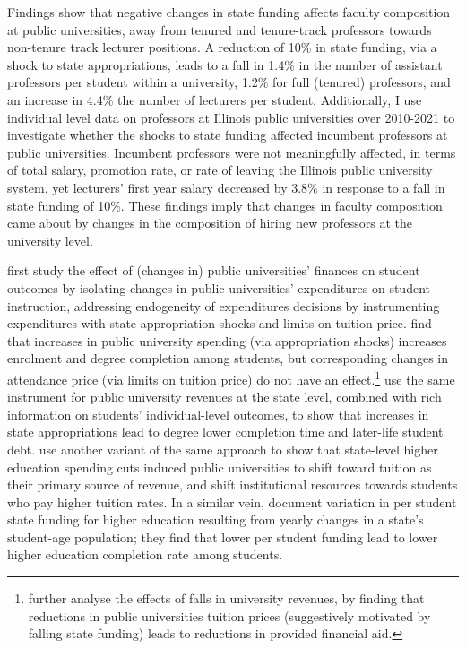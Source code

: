 \documentclass[notitlepage,12pt]{article}
\begin{document}
Findings show that negative changes in state funding affects faculty composition at public universities, away from tenured and tenure-track professors towards non-tenure track lecturer positions.
A reduction of 10\% in state funding, via a shock to state appropriations, leads to a fall in 1.4\% in the number of assistant professors per student within a university, 1.2\% for full (tenured) professors, and an increase in 4.4\% the number of lecturers per student.
Additionally, I use individual level data on professors at Illinois public universities over 2010-2021 to investigate whether the shocks to state funding affected incumbent professors at public universities.
Incumbent professors were not meaningfully affected, in terms of total salary, promotion rate, or rate of leaving the Illinois public university system, yet lecturers' first year salary decreased by 3.8\% in response to a fall in state funding of 10\%.
These findings imply that changes in faculty composition came about by changes in the composition of hiring new professors at the university level.

\cite{NBERw23736} first study the effect of (changes in) public universities' finances on student outcomes by isolating changes in public universities' expenditures on student instruction, addressing endogeneity of expenditures decisions by instrumenting expenditures with state appropriation shocks and limits on tuition price.
\cite{NBERw23736} find that increases in public university spending (via appropriation shocks) increases enrolment and degree completion among students, but corresponding changes in attendance price (via limits on tuition price) do not have an effect.\footnote{
    \cite{miller2022making} further analyse the effects of falls in university revenues, by finding that reductions in public universities tuition prices (suggestively motivated by falling state funding) leads to reductions in provided financial aid.
}
\cite{chakrabarti2018effect,NBERw27885} use the same instrument for public university revenues at the state level, combined with rich information on students' individual-level outcomes, to show that increases in state appropriations lead to degree lower completion time and later-life student debt.
\cite{bound2019public} use another variant of the same approach to show that state-level higher education spending cuts induced public universities to shift toward tuition as their primary source of revenue, and shift institutional resources towards students who pay higher tuition rates.
In a similar vein, \cite{bound2007cohort} document variation in per student state funding for higher education resulting from yearly changes in a state's student-age population; they find that lower per student funding lead to lower higher education completion rate among students.
\end{document}
